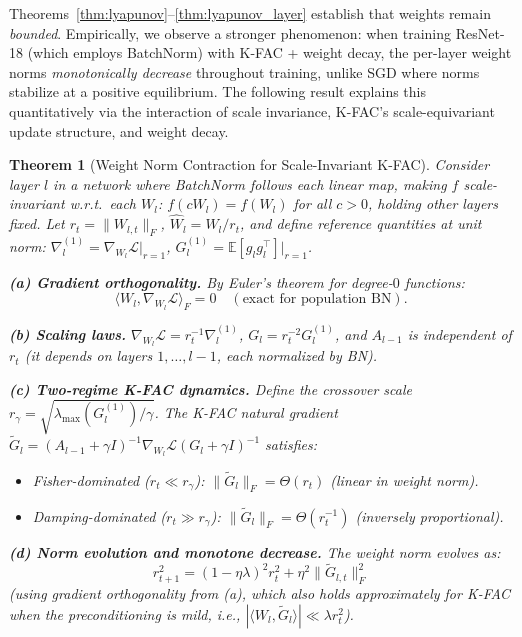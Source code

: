 \documentclass{article}
\providecommand{\E}{\mathbb{E}}
\providecommand{\norm}[1]{\lVert #1 \rVert}
\theoremstyle{plain}
\newtheorem{theorem}{Theorem}
\theoremstyle{definition}
\theoremstyle{remark}
\begin{document}
Theorems~\ref{thm:lyapunov}--\ref{thm:lyapunov_layer} establish that weights remain \emph{bounded}. Empirically, we observe a stronger phenomenon: when training ResNet-18 (which employs BatchNorm) with K-FAC + weight decay, the per-layer weight norms \emph{monotonically decrease} throughout training, unlike SGD where norms stabilize at a positive equilibrium. The following result explains this quantitatively via the interaction of scale invariance, K-FAC's scale-equivariant update structure, and weight decay.

\begin{theorem}[Weight Norm Contraction for Scale-Invariant K-FAC]
\label{thm:weight_contraction}
Consider layer $l$ in a network where BatchNorm follows each linear map, making $f$ scale-invariant w.r.t.\ each $W_l$: $f(cW_l) = f(W_l)$ for all $c > 0$, holding other layers fixed. Let $r_t = \norm{W_{l,t}}_F$, $\hat{W}_l = W_l/r_t$, and define reference quantities at unit norm: $\nabla_l^{(1)} = \nabla_{W_l}\mathcal{L}\big|_{r=1}$, $G_l^{(1)} = \E[g_l g_l^\top]\big|_{r=1}$.

\textbf{(a) Gradient orthogonality.} By Euler's theorem for degree-$0$ functions:
\begin{equation}
    \langle W_l, \nabla_{W_l}\mathcal{L}\rangle_F = 0 \quad (\text{exact for population BN}).
\end{equation}

\textbf{(b) Scaling laws.} $\nabla_{W_l}\mathcal{L} = r_t^{-1}\nabla_l^{(1)}$, $G_l = r_t^{-2}G_l^{(1)}$, and $A_{l-1}$ is independent of $r_t$ (it depends on layers $1,\ldots,l{-}1$, each normalized by BN).

\textbf{(c) Two-regime K-FAC dynamics.} Define the crossover scale $r_\gamma = \sqrt{\lambda_{\max}(G_l^{(1)})/\gamma}$. The K-FAC natural gradient $\tilde{G}_l = (A_{l-1}+\gamma I)^{-1}\nabla_{W_l}\mathcal{L}(G_l+\gamma I)^{-1}$ satisfies:
\begin{itemize}
    \item \emph{Fisher-dominated} ($r_t \ll r_\gamma$): $\norm{\tilde{G}_l}_F = \Theta(r_t)$ (linear in weight norm).
    \item \emph{Damping-dominated} ($r_t \gg r_\gamma$): $\norm{\tilde{G}_l}_F = \Theta(r_t^{-1})$ (inversely proportional).
\end{itemize}

\textbf{(d) Norm evolution and monotone decrease.} The weight norm evolves as:
\begin{equation}
\label{eq:norm_evolution}
    r_{t+1}^2 = (1-\eta\lambda)^2 r_t^2 + \eta^2\norm{\tilde{G}_{l,t}}_F^2
\end{equation}
(using gradient orthogonality from (a), which also holds approximately for K-FAC when the preconditioning is mild, i.e., $|\langle W_l, \tilde{G}_l\rangle| \ll \lambda r_t^2$).


\end{theorem}
\end{document}
